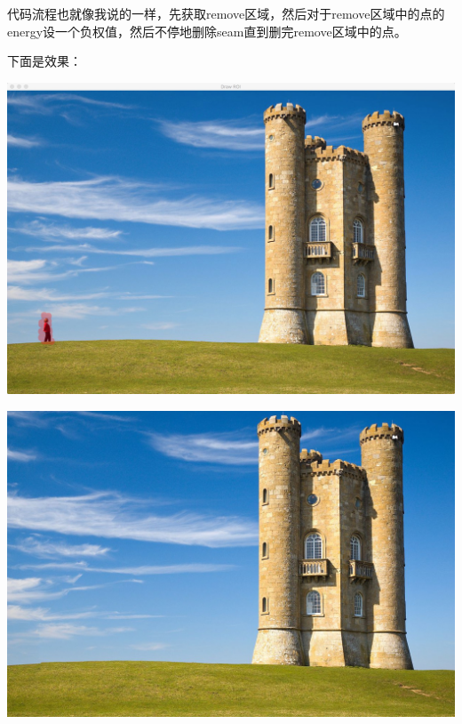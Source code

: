 \documentclass[10pt, a4paper]{article}
\begin{document}
    代码流程也就像我说的一样，先获取remove区域，然后对于remove区域中的点的energy设一个负权值，然后不停地删除seam直到删完remove区域中的点。

    下面是效果：

    \includegraphics[scale = .1]{remove.jpeg}

    \includegraphics[scale = .2]{removeResult.jpg}
\end{document}

